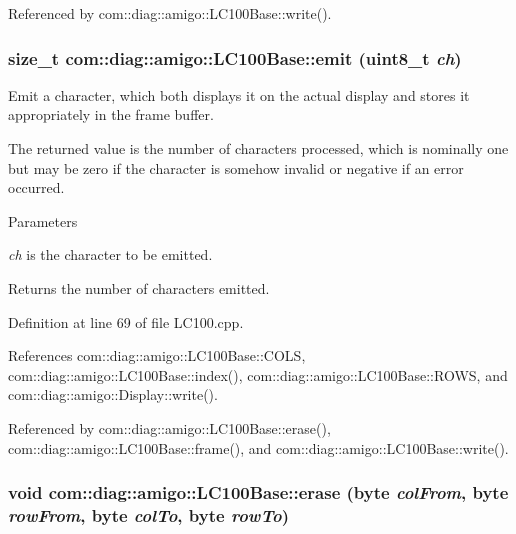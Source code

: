 Referenced by com::diag::amigo::LC100Base::write().

\hypertarget{classcom_1_1diag_1_1amigo_1_1LC100Base_adad20089d65b5744e062a7b02fc14ef6}{
\subsubsection[{emit}]{\setlength{\rightskip}{0pt plus 5cm}size\_\-t com::diag::amigo::LC100Base::emit (uint8\_\-t {\em ch})}}
\label{classcom_1_1diag_1_1amigo_1_1LC100Base_adad20089d65b5744e062a7b02fc14ef6}


Emit a character, which both displays it on the actual display and stores it appropriately in the frame buffer. 

The returned value is the number of characters processed, which is nominally one but may be zero if the character is somehow invalid or negative if an error occurred. 
\begin{DoxyParams}{Parameters}
\item[{\em ch}]is the character to be emitted. \end{DoxyParams}
\begin{DoxyReturn}{Returns}
the number of characters emitted. 
\end{DoxyReturn}


Definition at line 69 of file LC100.cpp.



References com::diag::amigo::LC100Base::COLS, com::diag::amigo::LC100Base::index(), com::diag::amigo::LC100Base::ROWS, and com::diag::amigo::Display::write().



Referenced by com::diag::amigo::LC100Base::erase(), com::diag::amigo::LC100Base::frame(), and com::diag::amigo::LC100Base::write().

\hypertarget{classcom_1_1diag_1_1amigo_1_1LC100Base_a4a92d06a7c79b66d6fa47581c727f688}{
\subsubsection[{erase}]{\setlength{\rightskip}{0pt plus 5cm}void com::diag::amigo::LC100Base::erase (byte {\em colFrom}, \/  byte {\em rowFrom}, \/  byte {\em colTo}, \/  byte {\em rowTo})}}
\label{classcom_1_1diag_1_1amigo_1_1LC100Base_a4a92d06a7c79b66d6fa47581c727f688}


